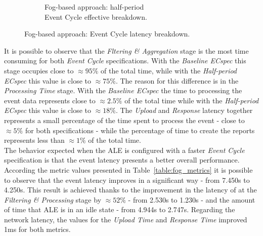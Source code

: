 \begin{figure}[ht!]
\begin{subfigure}{.5\textwidth}
    \caption{Fog-based approach: half-period\\Event Cycle effective breakdown.}
    \label{fig:ecspec_effective_half}
  \end{subfigure}
  \caption{Fog-based approach: Event Cycle latency breakdown.}
  \label{fig:ecspec_effective_breakdown}
\end{figure}

It is possible to observe that the \textit{Fltering \& Aggregation} stage is the most time consuming
for both \textit{Event Cycle} specifications. With the \textit{Baseline ECspec} this stage occupies
close to $\approx95\%$ of the total time, while with the \textit{Half-period ECspec} this value is
close to $\approx75\%$. The reason for this difference is in the \textit{Processing Time} stage.
With the \textit{Baseline ECspec} the time to processing the event data represents close to $\approx2.5\%$
of the total time while with the \textit{Half-period ECspec} this value is close to $\approx18\%$.
The \textit{Upload} and \textit{Response} latency together represents a small percentage of
the time spent to process the event - close to $\approx5\%$ for both specifications - while the percentage
of time to create the reports represents less than $\approx1\%$ of the total time.\\

The behavior expected when the \gls{ALE} is configured with a faster \textit{Event Cycle} specification
is that the event latency presents a better overall performance. According the metric values presented in
Table~\ref{table:fog_metrics} it is possible to observe that the event latency improves in a significant
way - from 7.450s to 4.250s. This result is achieved thanks to the improvement in the latency
of at the \textit{Filtering \& Processing} stage by $\approx52\%$ - from 2.530s to 1.230s - and the
amount of time that \gls{ALE} is in an idle state - from 4.944s to 2.747s. Regarding the network
latency, the values for the \textit{Upload Time} and \textit{Response Time} improved 1ms for both
metrics.\\

